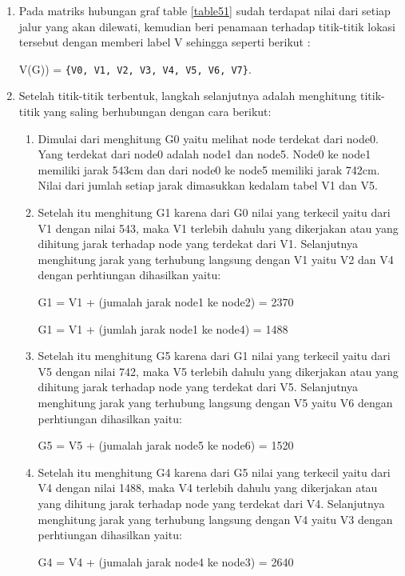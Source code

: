 \begin{enumerate}
    \item Pada matriks hubungan graf table \ref{table51} sudah terdapat nilai dari setiap jalur yang akan dilewati, kemudian beri penamaan terhadap titik-titik lokasi tersebut dengan memberi label V sehingga seperti berikut :
    \par V(G)) = \verb|{V0, V1, V2, V3, V4, V5, V6, V7}|.
    
    \item Setelah titik-titik terbentuk, langkah selanjutnya adalah menghitung titik-titik yang saling berhubungan dengan cara berikut:
    \begin{enumerate}
        \item Dimulai dari menghitung G0 yaitu melihat node terdekat dari node0. Yang terdekat dari node0 adalah node1 dan node5. Node0 ke node1 memiliki jarak 543cm dan dari node0 ke node5 memiliki jarak 742cm. Nilai dari jumlah setiap jarak dimasukkan kedalam tabel V1 dan V5.

        \item Setelah itu menghitung G1 karena dari G0 nilai yang terkecil yaitu dari V1 dengan nilai 543, maka V1 terlebih dahulu yang dikerjakan atau yang dihitung jarak terhadap node yang terdekat dari V1. Selanjutnya menghitung jarak yang terhubung langsung dengan V1 yaitu V2 dan V4 dengan perhtiungan dihasilkan yaitu:
            \par G1 = V1 + (jumalah jarak node1 ke node2) = 2370
            \par G1 = V1 + (jumlah jarak node1 ke node4) = 1488
        
        \item Setelah itu menghitung G5 karena dari G1 nilai yang terkecil yaitu dari V5 dengan nilai 742, maka V5 terlebih dahulu yang dikerjakan atau yang dihitung jarak terhadap node yang terdekat dari V5. Selanjutnya menghitung jarak yang terhubung langsung dengan V5 yaitu V6 dengan perhtiungan dihasilkan yaitu:
            \par G5 = V5 + (jumalah jarak node5 ke node6) = 1520
            
        \item Setelah itu menghitung G4 karena dari G5 nilai yang terkecil yaitu dari V4 dengan nilai 1488, maka V4 terlebih dahulu yang dikerjakan atau yang dihitung jarak terhadap node yang terdekat dari V4. Selanjutnya menghitung jarak yang terhubung langsung dengan V4 yaitu V3 dengan perhtiungan dihasilkan yaitu:
            \par G4 = V4 + (jumalah jarak node4 ke node3) = 2640        


\end{enumerate}
\end{enumerate}
